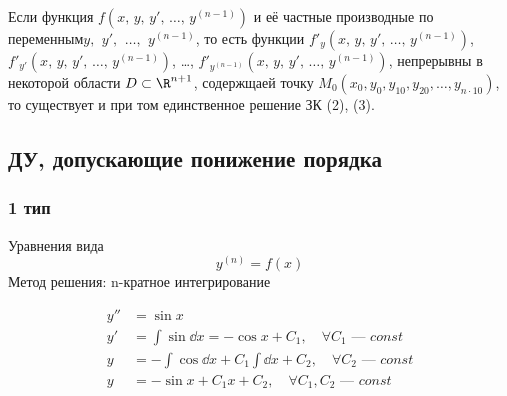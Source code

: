 \begin{theorem}
    Если функция $f\left(x,\, y,\, y',\, \ldots,\, y^{(n-1)}\right)$ и её частные производные по переменным\break$y,\,\ y',\,\ \ldots,\,\ y^{(n-1)}$, то есть функции $f'_y\left(x,\, y,\, y',\, \ldots,\, y^{(n-1)}\right)$, $f'_{y'}\left(x,\, y,\, y',\, \ldots,\, y^{(n-1)}\right)$, \ldots , $f'_{y^{(n-1)}}\left(x,\, y,\, y',\, \ldots,\, y^{(n-1)}\right)$, непрерывны в некоторой области $D \subset \R^{n+1}$, содержщаей точку $M_0(x_0, y_0, y_{10}, y_{20}, \ldots, y_{n\cdot 10})$, то существует и при том единственное решение ЗК (2), (3).
\end{theorem}

\subsection*{ДУ, допускающие понижение порядка}
\subsubsection*{1 тип}

Уравнения вида 
\[
    \boxed{y^{(n)} = f(x)} 
\]
Метод решения: n-кратное интегрирование \\

\begin{eg}
    \begin{align*}
        y'' &= \sin x \\
        y' &= \int \sin \dd{x} = -\cos x + C_1,\quad \forall C_1 \text{ --- } const \\
        y &= - \int \cos \dd{x} + C_1 \int \dd{x} + C_2,\quad \forall C_2 \text{ --- } const \\
        y &= - \sin x + C_1 x + C_2,\quad \forall C_1, C_2 \text{ --- } const
    \end{align*}
\end{eg}


